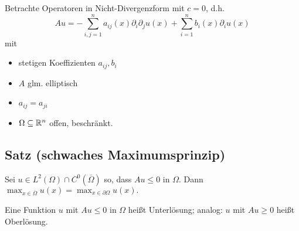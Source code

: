 Betrachte Operatoren in Nicht-Divergenzform mit $c = 0$, d.h. 
$$
Au = - \sum_{i,j = 1}^n a_{ij}(x) \partial_i \partial_j u(x) + \sum_{i = 1}^n b_i(x) \partial_i u(x)
$$
mit 
\begin{itemize}
  \item stetigen Koeffizienten $a_{ij}, b_i$
  \item $A$ glm. elliptisch
  \item $a_{ij} = a_{ji}$
  \item $\Omega \subseteq \mathbb{R}^n$ offen, beschränkt.
\end{itemize}

\subsection{Satz (schwaches Maximumsprinzip)}

Sei $u \in L^2(\Omega) \cap C^0(\overline \Omega)$ so, dass $Au \leq 0$ in $\Omega$. Dann $\max_{x \in \overline\Omega} u(x) = \max_{x \in \partial\Omega} u(x).$

\begin{bem}
  Eine Funktion $u$ mit $Au \leq 0$ in $\Omega$ heißt Unterlösung; analog: $u$ mit $A u \geq 0$ heißt Oberlösung.
\end{bem}

